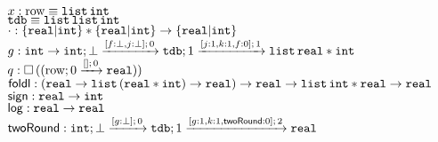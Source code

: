 \begin{tabbing}
    $ x: \trow \equiv \tlist{\tint}$\\
    $ \tdb \equiv \tlist{\tlist{\tint}} $\\
    $ \cdot: \{ \treal | \tint \} * \{ \treal | \tint \} \to \{ \treal | \tint \}$\\
    $ g: \tint \to \tarr{\tint}{
    \tarr{\tdb}{\tlist{\treal * \tint}}{1}{[j:1, k : 1, f : 0]}{1}  
    }{\bot}{[f: \bot, j : \bot]}{0}
    $\\      
    $ q: \tbox{  (\tarr{ \trow }{ \treal }{0}{[ ]}{0})     } $\\
    $ \mathsf{foldl} : (\treal \to \tlist{(\treal * \tint)} \to \treal) \to \treal \to \tlist{\tint * \treal} \to \treal$\\
    $ \mathsf{sign} : \treal \to \tint $\\
    $ \mathsf{log} : \treal \to \treal $\\
    $ \mathsf{twoRound} : \tarr{\tint}{
    \tarr{\tdb}{\treal}{1}{[g: 1, k: 1, \mathsf{twoRound}: 0]}{2}
    }
    {\bot}{[g:\bot]}{0} $
\end{tabbing}

